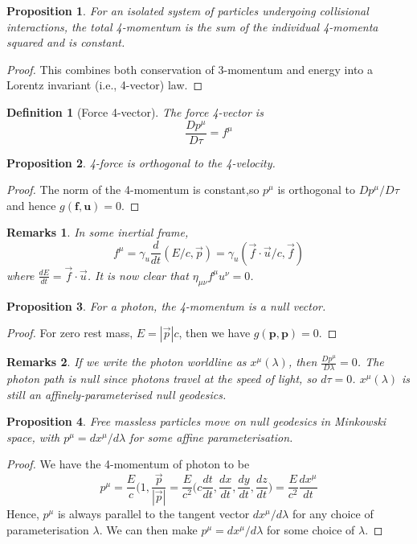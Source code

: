 \documentclass[a4paper]{article}
\newtheorem{remarks}{Remarks}[section]
\theoremstyle{new}
\newtheorem{defi}{Definition}[section]
\newtheorem{prop}{Proposition}[section]
\begin{document}
\begin{prop}
For an isolated system of particles undergoing collisional interactions, the total 4-momentum is the sum of the individual 4-momenta squared and is constant.
\end{prop}
\begin{proof}
This combines both conservation of 3-momentum and energy into a Lorentz invariant (i.e., 4-vector) law.
\end{proof}
\begin{defi}[Force 4-vector]
The force 4-vector is
$$\frac{Dp^\mu}{D\tau}=f^\mu$$
\end{defi}
\begin{prop}
4-force is orthogonal to the 4-velocity.
\end{prop}
\begin{proof}
The norm of the 4-momentum is constant,so $p^\mu$ is orthogonal to $Dp^\mu/D\tau$ and hence $g(\mathbf{f},\mathbf{u})=0$.
\end{proof}
\begin{remarks}
In some inertial frame,
$$f^\mu=\gamma_u\frac{d}{dt}(E/c,\vec{p})=\gamma_u(\vec{f}\cdot\vec{u}/c,\vec{f})$$
where $\frac{dE}{dt}=\vec{f}\cdot\vec{u}$. It is now clear that $\eta_{\mu\nu}f^\mu u^\nu=0$.
\end{remarks}
\begin{prop}
For a photon, the 4-momentum is a null vector.
\end{prop}
\begin{proof}
For zero rest mass, $E=|\vec{p}|c$, then we have $g(\mathbf{p},\mathbf{p})=0$.
\end{proof}
\begin{remarks}
If we write the photon worldline as $x^\mu(\lambda)$, then $\frac{Dp^\mu}{D\lambda}=0$. The photon path is null since photons travel at the speed of light, so $d\tau=0$. $x^\mu(\lambda)$ is still an affinely-parameterised null geodesics.
\end{remarks}
\begin{prop}
Free massless particles move on null geodesics in Minkowski space, with $p^\mu=dx^\mu/d\lambda$ for some affine parameterisation.
\end{prop}
\begin{proof}
We have the 4-momentum of photon to be
$$p^\mu=\frac{E}{c}\bigg(1,\frac{\vec{p}}{|\vec{p}|}=\frac{E}{c^2}\bigg(c\frac{dt}{dt},\frac{dx}{dt},\frac{dy}{dt},\frac{dz}{dt}\bigg)=\frac{E}{c^2}\frac{dx^\mu}{dt}$$
Hence, $p^\mu$ is always parallel to the tangent vector $dx^\mu/d\lambda$ for any choice of parameterisation $\lambda$. We can then make $p^\mu=dx^\mu/d\lambda$ for some choice of $\lambda$.
\end{proof}
\end{document}

